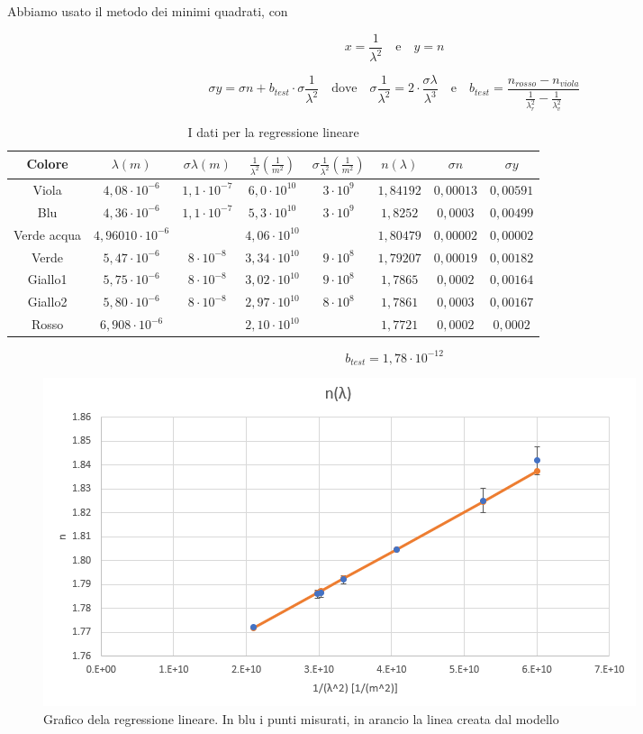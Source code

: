 \documentclass{article}
\begin{document}
Abbiamo usato il metodo dei minimi quadrati, con 

\[x=\frac{1}{\lambda ^2} \quad \textrm{e} \quad y=n\]

\[\sigma y = \sigma n + b_{test} \cdot \sigma \frac{1}{\lambda ^2} \quad \textrm{dove} \quad \sigma \frac{1}{\lambda ^2}=2 \cdot \frac{\sigma \lambda}{\lambda ^3} \quad \textrm{e} \quad  b_{test} = \frac{n_{rosso}-n_{viola}}{\frac{1}{\lambda _{r}^2}-\frac{1}{\lambda _{v}^2}}\]

\begin{table}[h!]
\centering
\begin{tabular}{ | c | c | c | c | c | c | c | c | }
  \hline
  Colore & $\lambda (m)$ & $\sigma \lambda (m)$ &  $\frac{1}{\lambda^2} (\frac{1}{m^2})$ & $\sigma \frac{1}{\lambda^2} (\frac{1}{m^2})$ & $n(\lambda)$ & $\sigma n$ & $\sigma y$\\
  \hline
  Viola & $4,08 \cdot 10^{-6}$ & $1,1 \cdot 10^{-7}$ & $6,0 \cdot 10^{10}$ & $3 \cdot 10^9$ & $1,84192$ & $0,00013$ & $0,00591$\\
  Blu & $4,36 \cdot 10^{-6}$ & $1,1 \cdot 10^{-7}$ & $5,3 \cdot 10^{10}$ & $3 \cdot 10^9$ & $1,8252$ & $0,0003$ & $0,00499$\\
  Verde acqua & $4,96010 \cdot 10^{-6}$ && $4,06 \cdot 10^{10}$ && $1,80479$ & $0,00002$ & $0,00002$\\
  Verde & $5,47 \cdot 10^{-6}$ & $8 \cdot 10^{-8}$ & $3,34 \cdot 10^{10}$ & $9 \cdot 10^8$ & $1,79207$ & $0,00019$ & $0,00182$\\
  Giallo1 & $5,75 \cdot 10^{-6}$ & $8 \cdot 10^{-8}$ & $3,02 \cdot 10^{10}$ & $9 \cdot 10^8$ & $1,7865$ & $0,0002$ & $0,00164$\\
  Giallo2 & $5,80 \cdot 10^{-6}$ & $8 \cdot 10^{-8}$ & $2,97 \cdot 10^{10}$ & $8 \cdot 10^8$ & $1,7861$ & $0,0003$ & $0,00167$\\
  Rosso & $6,908 \cdot 10^{-6}$ && $2,10 \cdot 10^{10}$ && $1,7721$ & $0,0002$ & $0,0002$\\
  \hline
\end{tabular}
  \caption{I dati per la regressione lineare}
  \label{table:1}
\end{table}

\[b_{test}=1,78 \cdot 10^{-12}\]

\begin{figure}[h!]
  \centering
  \includegraphics[width=0.9\linewidth]{GraficoPrisma2}
  \caption{Grafico dela regressione lineare. In blu i punti misurati, in arancio la linea creata dal modello}
\end{figure}
\end{document}
